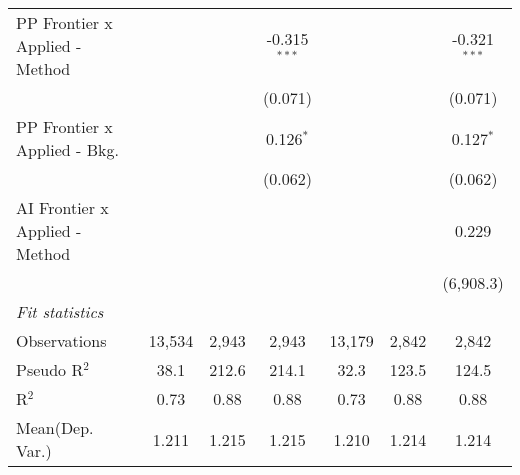 \begin{tabular}{lcccccc}
   PP Frontier x Applied - Method &                &                & -0.315$^{***}$ &                &                & -0.321$^{***}$\\   
                                  &                &                & (0.071)        &                &                & (0.071)\\   
   PP Frontier x Applied - Bkg.   &                &                & 0.126$^{*}$    &                &                & 0.127$^{*}$\\   
                                  &                &                & (0.062)        &                &                & (0.062)\\   
   AI Frontier x Applied - Method &                &                &                &                &                & 0.229\\   
                                  &                &                &                &                &                & (6,908.3)\\   
   \midrule
   \emph{Fit statistics}\\
   Observations                   & 13,534         & 2,943          & 2,943          & 13,179         & 2,842          & 2,842\\  
   Pseudo R$^2$                   & 38.1           & 212.6          & 214.1          & 32.3           & 123.5          & 124.5\\  
   R$^2$                          & 0.73           & 0.88           & 0.88           & 0.73           & 0.88           & 0.88\\  
Mean(Dep. Var.) & 1.211 & 1.215 & 1.215 & 1.210 & 1.214 & 1.214 \\
   

\end{tabular}
